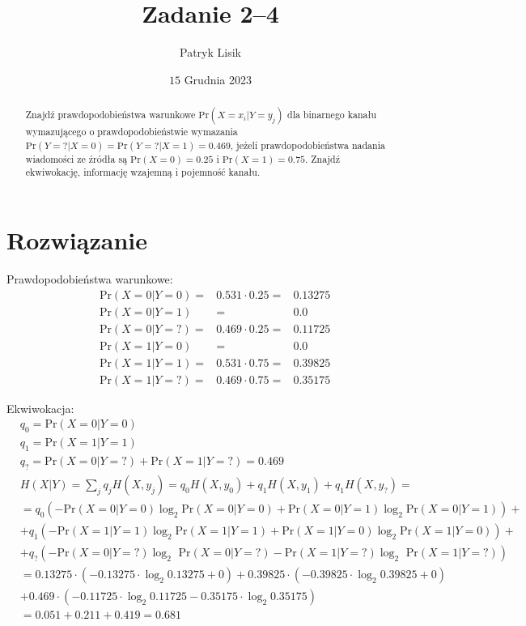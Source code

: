\documentclass[12pt]{article}
\title{Zadanie 2--4}
\author{Patryk Lisik}
\date{\(15\) Grudnia  2023}
\begin{document}
\maketitle
\renewcommand{\abstractname}{Treść}

\begin{abstract}
    Znajdź prawdopodobieństwa warunkowe $\text{Pr}(X=x_i|Y=y_j)$ dla binarnego kanału wymazującego
    o prawdopodobieństwie wymazania $\text{Pr}(Y=?|X= 0) = \text{Pr}(Y=?|X= 1) = 0.469$,
    jeżeli prawdopodobieństwa nadania wiadomości ze źródła są $\text{Pr}(X= 0) = 0.25$  i $\text{Pr}(X= 1) = 0.75$.
    Znajdź ekwiwokację, informację wzajemną i pojemność kanału.
\end{abstract}


\section*{Rozwiązanie}

Prawdopodobieństwa warunkowe:
\begin{align*}
    & \text{Pr}(X=0|Y=0) = &0.531 \cdot 0.25 =& 0.13275\\  
    & \text{Pr}(X=0|Y=1)  & = & 0.0 \\
    & \text{Pr}(X=0|Y=?) = &0.469 \cdot 0.25 =& 0.11725 \\
    & \text{Pr}(X=1|Y=0)  & = & 0.0 \\
    & \text{Pr}(X=1|Y=1) = &0.531 \cdot 0.75 = & 0.39825 \\
    & \text{Pr}(X=1|Y=?) = &0.469 \cdot 0.75 = & 0.35175
\end{align*}

Ekwiwokacja:
\begin{align*}
    & q_0 = \text{Pr}(X=0|Y=0) \\
    & q_1 = \text{Pr}(X=1|Y=1) \\
    & q_? = \text{Pr}(X=0|Y=?) + \text{Pr}(X=1|Y=?) = 0.469 \\
    & H(X|Y) = \sum_j q_j H(X,y_j) 
     = q_0H(X,y_0) + q_1H(X,y_1) + q_1H(X,y_?) =  \\
    & = q_0\left( - \text{Pr}(X=0|Y=0)\log_2\text{Pr}(X=0|Y=0)  +  \text{Pr}(X=0|Y=1)\log_2\text{Pr}(X=0|Y=1) \right) + \\ 
    & + q_1 \left( - \text{Pr}(X=1|Y=1)\log_2\text{Pr}(X=1|Y=1) + \text{Pr}(X=1|Y=0)\log_2\text{Pr}(X=1|Y=0)\right) + \\
    & + q_? \left( - \text{Pr}(X=0|Y=?)\log_2\text{ Pr}(X=0|Y=?) -
                     \text{Pr}(X=1|Y=?)\log_2\text{ Pr}(X=1|Y=?) \right) \\
    & = 0.13275 \cdot ( - 0.13275 \cdot \log_2 0.13275  + 0) + 0.39825 \cdot (- 0.39825 \cdot \log_2 0.39825 + 0) \\
    & + 0.469 \cdot ( - 0.11725 \cdot \log_2 0.11725 - 0.35175 \cdot \log_2 0.35175 ) \\
    & = 0.051 + 0.211 + 0.419 =  0.681
\end{align*}
\end{document}
